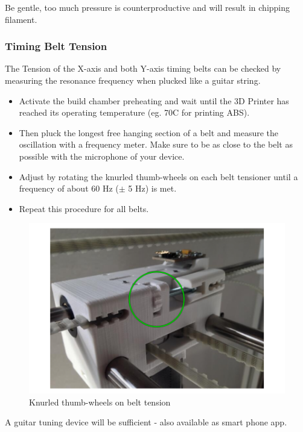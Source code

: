 \begin{info}
  Be gentle, too much pressure is counterproductive and will result in chipping filament.
\end{info}

\subsubsection{Timing Belt Tension} \label{sec:belttension}

The Tension of the X-axis and both Y-axis timing belts can be checked by measuring the resonance frequency when plucked like a guitar string.

\begin{itemize}
  \item Activate the build chamber preheating and wait until the 3D Printer 
        has reached its operating temperature (eg. 70\degree C for printing ABS).
  \item Then pluck the longest free hanging section of a belt and measure the oscillation with a frequency meter.
        Make sure to be as close to the belt as possible with the microphone of your device.
  \item Adjust by rotating the knurled thumb-wheels on each belt tensioner 
        until a frequency of about 60 Hz ($\pm$ 5 Hz) is met.
  \item Repeat this procedure for all belts.
\end{itemize}

\begin{figure}[H]
  \centering
  \includegraphics[width=.7\linewidth]{./img/mtc_belttension.png}
  \caption{Knurled thumb-wheels on belt tension}
\end{figure}

\begin{info}
  A guitar tuning device will be sufficient - also available as smart phone app.
\end{info}


